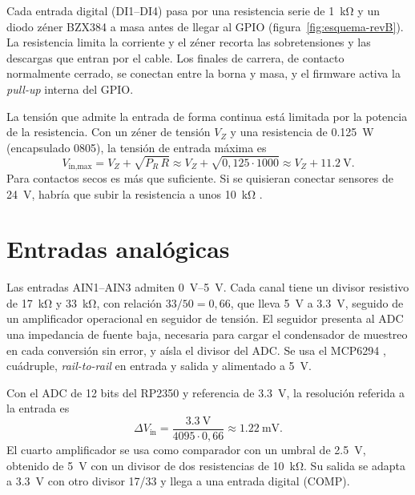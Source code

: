 Cada entrada digital (DI1--DI4) pasa por una resistencia serie de \SI{1}{\kilo\ohm} y un diodo zéner
BZX384 a masa \cite{bzx384} antes de llegar al GPIO (figura~\ref{fig:esquema-revB}). La resistencia
limita la corriente y el zéner recorta las sobretensiones y las descargas que entran por el cable.
Los finales de carrera, de contacto normalmente cerrado, se conectan entre la borna y masa, y el
firmware activa la \emph{pull-up} interna del GPIO.

La tensión que admite la entrada de forma continua está limitada por la potencia de la resistencia.
Con un zéner de tensión $V_Z$ y una resistencia de \SI{0.125}{\watt} (encapsulado 0805), la tensión
de entrada máxima es
\begin{equation}
  V_{\text{in,max}} = V_Z + \sqrt{P_R\,R} \approx V_Z + \sqrt{0{,}125 \cdot 1000} \approx V_Z + \SI{11.2}{\volt}.
\end{equation}
Para contactos secos es más que suficiente. Si se quisieran conectar sensores de \SI{24}{\volt},
habría que subir la resistencia a unos \SI{10}{\kilo\ohm}
.

\section{Entradas analógicas}

Las entradas AIN1--AIN3 admiten \SIrange{0}{5}{\volt}. Cada canal tiene un divisor resistivo de
\SI{17}{\kilo\ohm} y \SI{33}{\kilo\ohm}, con relación $33/50 = 0{,}66$, que lleva \SI{5}{\volt} a
\SI{3.3}{\volt}, seguido de un amplificador operacional en seguidor de tensión. El seguidor presenta
al ADC una impedancia de fuente baja, necesaria para cargar el condensador de muestreo en cada
conversión sin error, y aísla el divisor del ADC. Se usa el MCP6294 \cite{mcp629x}, cuádruple,
\emph{rail-to-rail} en entrada y salida y alimentado a \SI{5}{\volt}.

Con el ADC de 12 bits del RP2350 y referencia de \SI{3.3}{\volt}, la resolución referida a la
entrada es
\begin{equation}
  \Delta V_{\text{in}} = \frac{\SI{3.3}{\volt}}{4095 \cdot 0{,}66} \approx \SI{1.22}{\milli\volt}.
\end{equation}
El cuarto amplificador se usa como comparador con un umbral de \SI{2.5}{\volt}, obtenido de
\SI{5}{\volt} con un divisor de dos resistencias de \SI{10}{\kilo\ohm}. Su salida se adapta a
\SI{3.3}{\volt} con otro divisor 17/33 y llega a una entrada digital (COMP).

